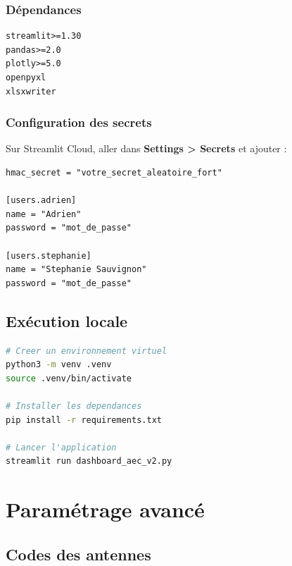 \documentclass[12pt,a4paper,twoside]{article}
\begin{document}
\subsubsection{D\'{e}pendances}

\begin{lstlisting}[caption={requirements.txt}]
streamlit>=1.30
pandas>=2.0
plotly>=5.0
openpyxl
xlsxwriter
\end{lstlisting}

\subsubsection{Configuration des secrets}

Sur Streamlit Cloud, aller dans \textbf{Settings > Secrets} et ajouter :

\begin{lstlisting}[caption={.streamlit/secrets.toml}]
hmac_secret = "votre_secret_aleatoire_fort"

[users.adrien]
name = "Adrien"
password = "mot_de_passe"

[users.stephanie]
name = "Stephanie Sauvignon"
password = "mot_de_passe"
\end{lstlisting}

\subsection{Ex\'{e}cution locale}

\begin{lstlisting}[language=bash, caption={Lancement local}]
# Creer un environnement virtuel
python3 -m venv .venv
source .venv/bin/activate

# Installer les dependances
pip install -r requirements.txt

# Lancer l'application
streamlit run dashboard_aec_v2.py
\end{lstlisting}

\section{Param\'{e}trage avanc\'{e}}

\subsection{Codes des antennes}
\end{document}
